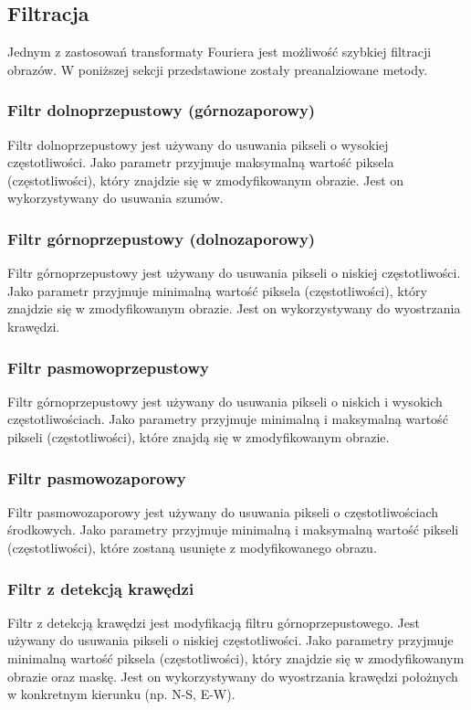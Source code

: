 \documentclass{classrep}
\begin{document}
\subsection{Filtracja}
Jednym z zastosowań transformaty Fouriera jest możliwość szybkiej filtracji obrazów. W poniższej sekcji przedstawione zostały preanalziowane metody.

\subsubsection{Filtr dolnoprzepustowy (górnozaporowy)}
Filtr dolnoprzepustowy jest używany do usuwania pikseli o wysokiej częstotliwości. Jako parametr przyjmuje maksymalną wartość piksela (częstotliwości), który znajdzie się w zmodyfikowanym obrazie. Jest on wykorzystywany do usuwania szumów.

\subsubsection{Filtr górnoprzepustowy (dolnozaporowy)}
Filtr górnoprzepustowy jest używany do usuwania pikseli o niskiej częstotliwości. Jako parametr przyjmuje minimalną wartość piksela (częstotliwości), który znajdzie się w zmodyfikowanym obrazie. Jest on wykorzystywany do wyostrzania krawędzi.

\subsubsection{Filtr pasmowoprzepustowy}
Filtr górnoprzepustowy jest używany do usuwania pikseli o niskich i wysokich częstotliwościach. Jako parametry przyjmuje minimalną i maksymalną wartość pikseli (częstotliwości), które znajdą się w zmodyfikowanym obrazie.

\subsubsection{Filtr pasmowozaporowy}
Filtr pasmowozaporowy jest używany do usuwania pikseli o częstotliwościach środkowych. Jako parametry przyjmuje minimalną i maksymalną wartość pikseli (częstotliwości), które zostaną usunięte z modyfikowanego obrazu.

\subsubsection{Filtr z detekcją krawędzi}
Filtr z detekcją krawędzi jest modyfikacją filtru górnoprzepustowego. Jest używany do usuwania pikseli o niskiej częstotliwości. Jako parametry przyjmuje minimalną wartość piksela (częstotliwości), który znajdzie się w zmodyfikowanym obrazie oraz maskę. Jest on wykorzystywany do wyostrzania krawędzi położnych w konkretnym kierunku (np. N-S, E-W).
\end{document}
